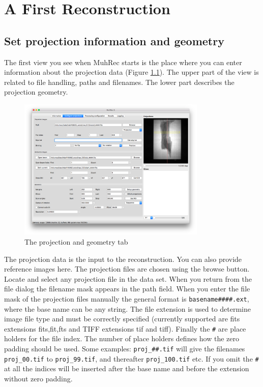 \documentclass[a4paper]{scrreprt}
\begin{document}
\chapter{A First Reconstruction}

\section{Set projection information and geometry}
The first view you see when MuhRec starts is the place where you can enter information about the projection data (Figure \ref{fig_ProjectionGeometry}). The upper part of the view is related to file handling, paths and filenames. The lower part describes the projection geometry.  
\begin{figure}[ht!]
\centering
 \includegraphics[width=0.8\textwidth]{figures3/Main_DataAndGeometry.png}
\caption{The projection and geometry tab}\label{fig_ProjectionGeometry}
\end{figure}

The projection data is the input to the reconstruction. You can also provide reference images here. The projection files are chosen using the browse button. Locate and select any projection file in the data set. When you return from the file dialog the filename mask appears in the path field.
When you enter the file mask of the projection files manually the general format is \verb+basename####.ext+,
where the base name can be any string. The file extension is used to determine image file type and must
be correctly specified (currently supported are fits extensions fits,fit,fts and TIFF extensions tif and tiff). Finally the \verb+#+ are place holders for the file index. The number of place holders defines how the zero padding should be used. Some examples: \verb+proj_##.tif+ will give
the filenames \verb+proj_00.tif+ to \verb+proj_99.tif+, and thereafter \verb+proj_100.tif+ etc.
If you omit the \verb+#+ at all the indices will be inserted after the base name and before the extension without zero padding.
\end{document}
